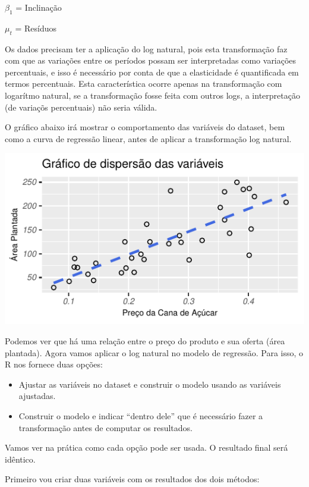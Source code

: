 \documentclass[
  11pt,
  a4paper,
]{article}
\begin{document}
\(\beta_1\) = Inclinação

\(\mu_t\) = Resíduos

Os dados precisam ter a aplicação do log natural, pois esta transformação faz com que as variações entre os períodos possam ser interpretadas como variações percentuais, e isso é necessário por conta de que a elasticidade é quantificada em termos percentuais. Esta característica ocorre apenas na transformação com logarítmo natural, se a transformação fosse feita com outros logs, a interpretação (de variaçõs percentuais) não seria válida.

O gráfico abaixo irá mostrar o comportamento das variáveis do dataset, bem como a curva de regressão linear, antes de aplicar a transformação log natural.

\begin{center}\includegraphics{article_files/figure-latex/unnamed-chunk-5-1} \end{center}

Podemos ver que há uma relação entre o preço do produto e sua oferta (área plantada). Agora vamos aplicar o log natural no modelo de regressão. Para isso, o R nos fornece duas opções:

\begin{itemize}
\item
  Ajustar as variáveis no dataset e construir o modelo usando as variáveis ajustadas.
\item
  Construir o modelo e indicar ``dentro dele'' que é necessário fazer a transformação antes de computar os resultados.
\end{itemize}

Vamos ver na prática como cada opção pode ser usada. O resultado final será idêntico.

Primeiro vou criar duas variáveis com os resultados dos dois métodos:
\end{document}
